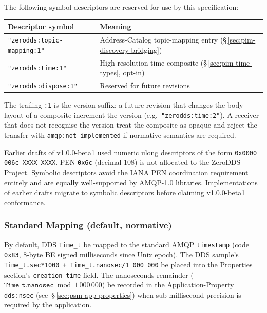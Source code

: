\documentclass{../styles/zerodds-vendor-spec}
\begin{document}
The following symbol descriptors are reserved for use by this
specification:

\begin{longtable}{p{4.5cm}p{8cm}}
  \toprule
  \textbf{Descriptor symbol} & \textbf{Meaning} \\
  \midrule
  \endhead
  \texttt{"zerodds:topic-mapping:1"} & Address-Catalog topic-mapping entry (\S\,\ref{sec:pim-discovery-bridging}) \\
  \texttt{"zerodds:time:1"}          & High-resolution time composite (\S\,\ref{sec:pim-time-types}, opt-in) \\
  \texttt{"zerodds:dispose:1"}       & Reserved for future revisions \\
  \bottomrule
\end{longtable}

The trailing \texttt{:1} is the version suffix; a future
revision that changes the body layout of a composite 
increment the version (e.g.\ \texttt{"zerodds:time:2"}). A
receiver that does not recognise the version  treat
the composite as opaque and reject the transfer with
\texttt{amqp:not-implemented} if normative semantics are
required.

\begin{specnote}
Earlier drafts of v1.0.0-beta1 used numeric ulong descriptors of
the form \texttt{0x0000\,006c\,XXXX\,XXXX}. PEN \texttt{0x6c}
(decimal 108) is not allocated to the ZeroDDS Project. Symbolic
descriptors avoid the IANA PEN coordination requirement entirely
and are equally well-supported by AMQP-1.0 libraries.
Implementations of earlier drafts  migrate to
symbolic descriptors before claiming v1.0.0-beta1 conformance.
\end{specnote}

\subsubsection{Standard Mapping (default, normative)}

By default, DDS \texttt{Time\_t}  be mapped to the
standard AMQP \texttt{timestamp} (code \texttt{0x83}, 8-byte BE
signed milliseconds since Unix epoch). The DDS sample's
\texttt{Time\_t.sec*1000 + Time\_t.nanosec/1\,000\,000}
 be placed into the Properties section's
\texttt{creation-time} field. The nanoseconds remainder
($\texttt{Time\_t.nanosec} \bmod 1\,000\,000$)  be
recorded in the Application-Property \texttt{dds:nsec}
(see~\S\,\ref{sec:psm-app-properties}) when sub-millisecond
precision is required by the application.
\end{document}
